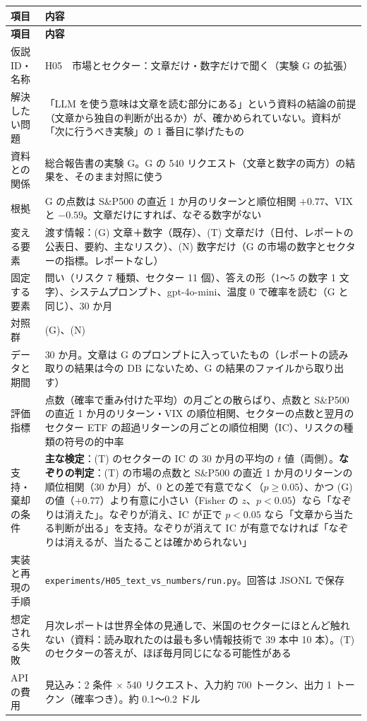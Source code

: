 \documentclass[xelatex,ja=standard,jafont=haranoaji,a4paper,10pt,openany]{bxjsreport}
\newcommand{\code}[1]{\texttt{#1}}
\newcommand{\SP}{S\&P500}
\newenvironment{plan}{\small\begin{longtable}{p{3.3cm}p{11.6cm}}\toprule\textbf{項目} & \textbf{内容} \\\midrule\endfirsthead
\toprule\textbf{項目} & \textbf{内容} \\\midrule\endhead\bottomrule\endfoot}{\end{longtable}}
\begin{document}
\begin{plan}
仮説 ID・名称 & H05　市場とセクター：文章だけ・数字だけで聞く（実験 G の拡張） \\
解決したい問題 & 「LLM を使う意味は文章を読む部分にある」という資料の結論の前提（文章から独自の判断が出るか）が、確かめられていない。資料が「次に行うべき実験」の 1 番目に挙げたもの \\
資料との関係 & 総合報告書の実験 G。G の 540 リクエスト（文章と数字の両方）の結果を、そのまま対照に使う \\
根拠 & G の点数は \SP{} の直近 1 か月のリターンと順位相関 $+0.77$、VIX と $-0.59$。文章だけにすれば、なぞる数字がない \\
変える要素 & 渡す情報：(G) 文章＋数字（既存）、(T) 文章だけ（日付、レポートの公表日、要約、主なリスク）、(N) 数字だけ（G の市場の数字とセクターの指標。レポートなし） \\
固定する要素 & 問い（リスク 7 種類、セクター 11 個）、答えの形（1〜5 の数字 1 文字）、システムプロンプト、gpt-4o-mini、温度 0 で確率を読む（G と同じ）、30 か月 \\
対照群 & (G)、(N) \\
データと期間 & 30 か月。文章は G のプロンプトに入っていたもの（レポートの読み取りの結果は今の DB にないため、G の結果のファイルから取り出す） \\
評価指標 & 点数（確率で重み付けた平均）の月ごとの散らばり、点数と \SP{} の直近 1 か月のリターン・VIX の順位相関、セクターの点数と翌月のセクター ETF の超過リターンの月ごとの順位相関（IC）、リスクの種類の符号の的中率 \\
支持・棄却の条件 & \textbf{主な検定}：(T) のセクターの IC の 30 か月の平均の $t$ 値（両側）。\textbf{なぞりの判定}：(T) の市場の点数と \SP{} の直近 1 か月のリターンの順位相関（30 か月）が、0 との差で有意でなく（$p\ge0.05$）、かつ (G) の値（$+0.77$）より有意に小さい（Fisher の $z$、$p<0.05$）なら「なぞりは消えた」。なぞりが消え、IC が正で $p<0.05$ なら「文章から当たる判断が出る」を支持。なぞりが消えて IC が有意でなければ「なぞりは消えるが、当たることは確かめられない」 \\
実装と再現の手順 & \code{experiments/H05\_text\_vs\_numbers/run.py}。回答は JSONL で保存 \\
想定される失敗 & 月次レポートは世界全体の見通しで、米国のセクターにほとんど触れない（資料：読み取れたのは最も多い情報技術で 39 本中 10 本）。(T) のセクターの答えが、ほぼ毎月同じになる可能性がある \\
API の費用 & 見込み：2 条件 $\times$ 540 リクエスト、入力約 700 トークン、出力 1 トークン（確率つき）。約 0.1〜0.2 ドル \\
\end{plan}
\end{document}
